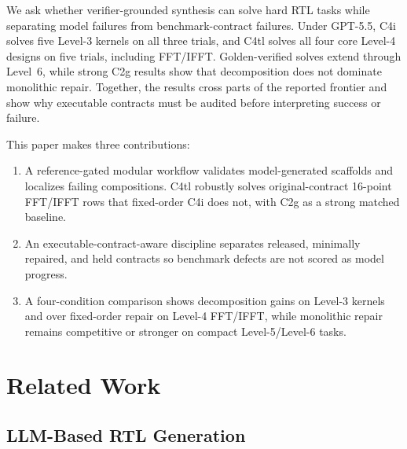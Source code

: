 \documentclass[sigconf,anonymous]{acmart}
\newcommand{\cTwoG}{C2g\xspace}
\newcommand{\cFourI}{C4i\xspace}
\newcommand{\cFourTL}{C4tl\xspace}
\begin{document}
We ask whether verifier-grounded synthesis can solve hard RTL tasks while separating model failures from benchmark-contract failures.
Under GPT-5.5, \cFourI solves five Level-3 kernels on all three trials, and \cFourTL solves all four core Level-4 designs on five trials, including FFT/IFFT.
Golden-verified solves extend through Level~6, while strong \cTwoG results show that decomposition does not dominate monolithic repair.
Together, the results cross parts of the reported frontier and show why executable contracts must be audited before interpreting success or failure.

This paper makes three contributions:
\begin{enumerate}[leftmargin=*]
    \item A reference-gated modular workflow validates model-generated scaffolds and localizes failing compositions. \cFourTL robustly solves original-contract 16-point FFT/IFFT rows that fixed-order \cFourI does not, with \cTwoG as a strong matched baseline.
    \item An executable-contract-aware discipline separates released, minimally repaired, and held contracts so benchmark defects are not scored as model progress.
    \item A four-condition comparison shows decomposition gains on Level-3 kernels and over fixed-order repair on Level-4 FFT/IFFT, while monolithic repair remains competitive or stronger on compact Level-5/Level-6 tasks.
\end{enumerate}

\section{Related Work}

\subsection{LLM-Based RTL Generation}
\end{document}
